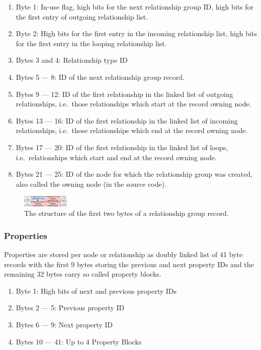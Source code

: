 \documentclass[a4paper,10pt]{article}
\begin{document}
            \begin{enumerate}
                \item Byte 1: In-use flag, high bits for the next relationship group ID, high bits for the first entry of outgoing relationship list.
                \item Byte 2: High bits for the first entry in the incoming relationship list, high bits for the first entry in the looping relationship list.
                \item Bytes 3 and 4: Relationship type ID
                \item Bytes 5 --- 8: ID of the next relationship group record.
                \item Bytes 9 --- 12: ID of the first relationship in the linked list of outgoing relationships, i.e.\ those relationships which start at the record owning node.
                \item Bytes 13 --- 16: ID of the first relationship in the linked list of incoming relationships, i.e.\ those relationships which end at the record owning node.
                \item Bytes 17 --- 20: ID of the first relationship in the linked list of loops, i.e.\ relationships which start and end at the record owning node.
                \item Bytes 21 --- 25: ID of the node for which the relationship group was created, also called the owning node (in the source code).
            \end{enumerate}
            
            \begin{figure}[htp]\label{rel_group_first_bytes}
                \begin{center}
                    \includegraphics[keepaspectratio,height=0.2\textheight,width=0.2\textwidth]{img/03_record/relationship/relationship_group_first_bytes.png}
                \end{center}
                \caption{The structure of the first two bytes of a relationship group record.}
            \end{figure}
        

        \subsubsection{Properties}
            Properties are stored per node or relationship as doubly linked list of 41 byte records with the first 9 bytes storing the previous and next property IDs and the remaining 32 bytes carry so called property blocks.
            \begin{enumerate}
            \item Byte 1: High bits of next and previous property IDs
            \item Bytes 2 --- 5: Previous property ID
            \item Bytes 6 --- 9: Next property ID
            \item Bytes 10 --- 41: Up to 4 Property Blocks
            \end{enumerate}
            
\end{document}
